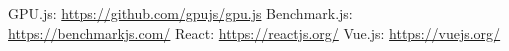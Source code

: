 \newpage
\begin{thebibliography}{9}
    GPU.js: \url{https://github.com/gpujs/gpu.js}
    Benchmark.js: \url{https://benchmarkjs.com/}
    React: \url{https://reactjs.org/}
    Vue.js: \url{https://vuejs.org/}
\end{thebibliography}